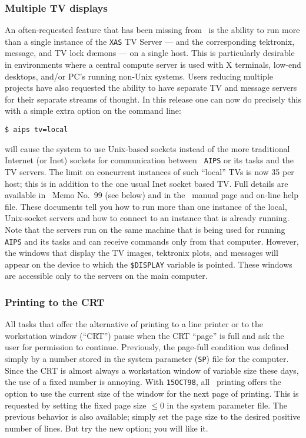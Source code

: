 \subsubsection{Multiple TV displays}

An often-requested feature that has been missing from \AIPS\ is the
ability to run more than a single instance of the {\tt XAS} TV Server
---  and the corresponding tektronix, message, and TV lock d\ae mons
--- on a single host.  This is particularly desirable in environments
where a central compute server is used with X terminals, low-end
desktops, and/or PC's running non-Unix systems.  Users reducing
multiple projects have also requested the ability to have separate
TV and message servers for their separate streams of thought.  In this
release one can now do precisely this with a simple extra option on
the command line: \par
\vspace{4pt}
\centerline{\tt \$ aips tv=local \hfil}\par

will cause the system to use Unix-based sockets instead of the more
traditional Internet (or Inet) sockets for communication between {\tt
AIPS} or its tasks and the TV servers.  The limit on concurrent
instances of such ``local'' TVs is now 35 per host; this is in
addition to the one usual Inet socket based TV.  Full details are
available in \AIPS\ Memo No.~99 (see below) and in the \AIPS\ manual
page and on-line help file.  These documents tell you how to run more
than one instance of the local, Unix-socket servers and how to connect
to an instance that is already running.  Note that the servers run on
the same machine that is being used for running {\tt AIPS}  and its
tasks and can receive commands only from that computer.  However, the
windows that display the TV images, tektronix plots, and messages will
appear on the device to which the {\tt \$DISPLAY} variable is pointed.
These windows are accessible only to the servers on the main computer.

\subsubsection{Printing to the CRT}

All tasks that offer the alternative of printing to a line printer or
to the workstation window (``CRT'') pause when the CRT ``page'' is
full and ask the user for permission to continue.  Previously, the
page-full condition was defined simply by a number stored in the
system parameter ({\tt SP}) file for the computer.  Since the CRT is
almost always a workstation window of variable size these days, the
use of a fixed number is annoying.  With {\tt 15OCT98}, all \AIPS\
printing offers the option to use the current size of the window for
the next page of printing.  This is requested by setting the fixed
page size $\leq 0$ in the system parameter file.  The previous
behavior is also available; simply set the page size to the desired
positive number of lines.  But try the new option; you will like it.

